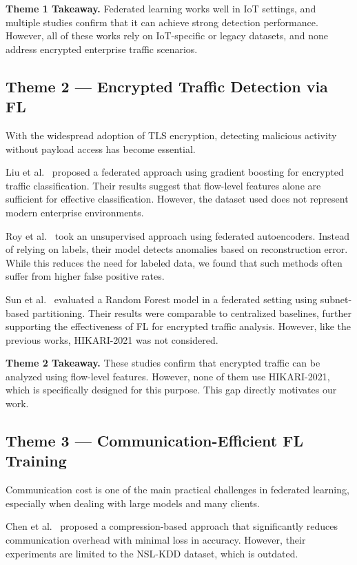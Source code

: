 \documentclass[conference]{IEEEtran}
\begin{document}
\medskip
\noindent\textbf{Theme 1 Takeaway.} Federated learning works well in IoT settings, and multiple studies confirm that it can achieve strong detection performance. However, all of these works rely on IoT-specific or legacy datasets, and none address encrypted enterprise traffic scenarios.

\subsection{Theme 2 --- Encrypted Traffic Detection via FL}

With the widespread adoption of TLS encryption, detecting malicious activity without payload access has become essential.

Liu et al.~\cite{liu2023} proposed a federated approach using gradient boosting for encrypted traffic classification. Their results suggest that flow-level features alone are sufficient for effective classification. However, the dataset used does not represent modern enterprise environments.

Roy et al.~\cite{roy2021} took an unsupervised approach using federated autoencoders. Instead of relying on labels, their model detects anomalies based on reconstruction error. While this reduces the need for labeled data, we found that such methods often suffer from higher false positive rates.

Sun et al.~\cite{sun2023} evaluated a Random Forest model in a federated setting using subnet-based partitioning. Their results were comparable to centralized baselines, further supporting the effectiveness of FL for encrypted traffic analysis. However, like the previous works, HIKARI-2021 was not considered.

\medskip
\noindent\textbf{Theme 2 Takeaway.} These studies confirm that encrypted traffic can be analyzed using flow-level features. However, none of them use HIKARI-2021, which is specifically designed for this purpose. This gap directly motivates our work.

\subsection{Theme 3 --- Communication-Efficient FL Training}

Communication cost is one of the main practical challenges in federated learning, especially when dealing with large models and many clients.

Chen et al.~\cite{chen2023} proposed a compression-based approach that significantly reduces communication overhead with minimal loss in accuracy. However, their experiments are limited to the NSL-KDD dataset, which is outdated.
\end{document}
